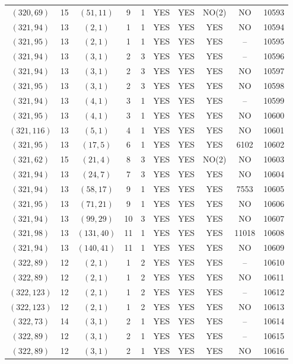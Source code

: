 \begin{longtable}{|c|c|c|c|c|c|c|c|c|c|}
$(320, 69)$ & 15 & $(51, 11)$ & 9 & 1 & YES & YES & NO(2) & NO & 10593\\
$(321, 94)$ & 13 & $(2, 1)$ & 1 & 1 & YES & YES & YES & NO & 10594\\
$(321, 95)$ & 13 & $(2, 1)$ & 1 & 1 & YES & YES & YES & -- & 10595\\
$(321, 94)$ & 13 & $(3, 1)$ & 2 & 3 & YES & YES & YES & -- & 10596\\
$(321, 94)$ & 13 & $(3, 1)$ & 2 & 3 & YES & YES & YES & NO & 10597\\
$(321, 95)$ & 13 & $(3, 1)$ & 2 & 3 & YES & YES & YES & NO & 10598\\
$(321, 94)$ & 13 & $(4, 1)$ & 3 & 1 & YES & YES & YES & -- & 10599\\
$(321, 95)$ & 13 & $(4, 1)$ & 3 & 1 & YES & YES & YES & NO & 10600\\
$(321, 116)$ & 13 & $(5, 1)$ & 4 & 1 & YES & YES & YES & NO & 10601\\
$(321, 95)$ & 13 & $(17, 5)$ & 6 & 1 & YES & YES & YES & 6102 & 10602\\
$(321, 62)$ & 15 & $(21, 4)$ & 8 & 3 & YES & YES & NO(2) & NO & 10603\\
$(321, 94)$ & 13 & $(24, 7)$ & 7 & 3 & YES & YES & YES & NO & 10604\\
$(321, 94)$ & 13 & $(58, 17)$ & 9 & 1 & YES & YES & YES & 7553 & 10605\\
$(321, 95)$ & 13 & $(71, 21)$ & 9 & 1 & YES & YES & YES & NO & 10606\\
$(321, 94)$ & 13 & $(99, 29)$ & 10 & 3 & YES & YES & YES & NO & 10607\\
$(321, 98)$ & 13 & $(131, 40)$ & 11 & 1 & YES & YES & YES & 11018 & 10608\\
$(321, 94)$ & 13 & $(140, 41)$ & 11 & 1 & YES & YES & YES & NO & 10609\\
$(322, 89)$ & 12 & $(2, 1)$ & 1 & 2 & YES & YES & YES & -- & 10610\\
$(322, 89)$ & 12 & $(2, 1)$ & 1 & 2 & YES & YES & YES & NO & 10611\\
$(322, 123)$ & 12 & $(2, 1)$ & 1 & 2 & YES & YES & YES & -- & 10612\\
$(322, 123)$ & 12 & $(2, 1)$ & 1 & 2 & YES & YES & YES & NO & 10613\\
$(322, 73)$ & 14 & $(3, 1)$ & 2 & 1 & YES & YES & YES & -- & 10614\\
$(322, 89)$ & 12 & $(3, 1)$ & 2 & 1 & YES & YES & YES & -- & 10615\\
$(322, 89)$ & 12 & $(3, 1)$ & 2 & 1 & YES & YES & YES & NO & 10616\\

\end{longtable}
